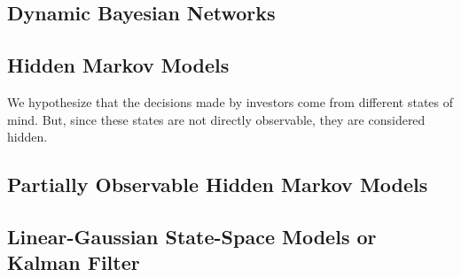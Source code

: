 \documentclass[a4paper]{article}
\begin{document}
\subsection{Dynamic Bayesian Networks}
\subsection{Hidden Markov Models}
We hypothesize that the decisions made by investors come from different states of mind. But, since these states are not directly observable, they are considered hidden.
\subsection{Partially Observable Hidden Markov Models}
\subsection{Linear-Gaussian State-Space Models or Kalman Filter}


\end{document}
